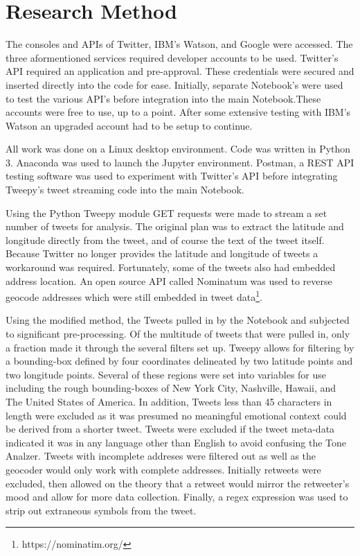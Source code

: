 \documentclass[12pt, oneside]{article}
\begin{document}
\section{Research Method}

The consoles and APIs of Twitter, IBM's Watson, and Google were
accessed. The three aformentioned services required developer accounts to be
used. Twitter's API required an application and pre-approval. These
credentials were secured and inserted directly into the code for ease.
Initially, separate Notebook's were used to test the various API's before
integration into the main Notebook.These accounts were free to use, up to a
point. After some extensive testing with IBM's Watson an
upgraded account had to be setup to continue.

All work was done on a Linux desktop environment. Code was written in Python
3. Anaconda was used to launch the Jupyter environment. Postman, a REST API testing software was used to experiment with Twitter's
API\cite{Postman} before integrating Tweepy's tweet streaming code into the
main Notebook.

Using the Python Tweepy module GET requests were made to stream a set number of
tweets for analysis. The original plan was to extract the latitude and
longitude directly from the tweet, and of course
the text of the tweet itself. Because Twitter no longer provides the latitude
and longitude of tweets a workaround was required. Fortunately, some of the
tweets also had embedded address location. An open source API called Nominatum
was used to reverse geocode addresses which were still embedded in tweet
data\footnote{https://nominatim.org/}.

Using the modified method, the Tweets pulled in by the Notebook and subjected
to significant pre-processing. Of the multitude of tweets that were pulled in,
only a fraction made it through the several filters set up. Tweepy allows for
filtering by a bounding-box defined by four coordinates delineated by
two latitude points and two longitude points. Several of these regions were set
into variables for use including the rough bounding-boxes of New York
City, Nashville, Hawaii, and The United States of America. In addition, Tweets
less than 45 characters in length were excluded as it was presumed no
meaningful emotional context could be derived from a shorter tweet.
Tweets were excluded if the tweet meta-data indicated it was in any language
other than English to avoid confusing the Tone Analzer. Tweets with incomplete
addreses were filtered out as well as the geocoder would only work with
complete addresses. Initially retweets were excluded, then allowed on the
theory that a retweet would mirror the retweeter's mood and allow for more data
collection. Finally, a regex expression was used to strip out extraneous
symbols from the tweet.
\end{document}
